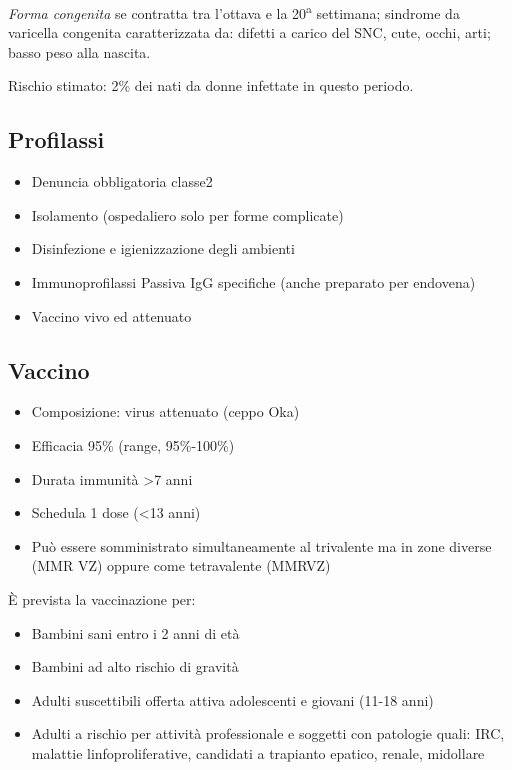 \emph{Forma congenita} se contratta tra l'ottava e la
20\textsuperscript{a} settimana; sindrome da varicella congenita
caratterizzata da: difetti a carico del SNC, cute, occhi, arti; basso
peso alla nascita.

Rischio stimato: 2\% dei nati da donne infettate in questo periodo.

\subsection{Profilassi}

\begin{itemize}
\item
  Denuncia obbligatoria classe2
\item
  Isolamento (ospedaliero solo per forme complicate)
\item
  Disinfezione e igienizzazione degli ambienti
\item
  Immunoprofilassi Passiva IgG specifiche (anche preparato per endovena)
\item
  Vaccino vivo ed attenuato
\end{itemize}

\subsection{Vaccino}

\begin{itemize}
\item
  Composizione: virus attenuato (ceppo Oka)
\item
  Efficacia 95\% (range, 95\%-100\%)
\item
  Durata immunità \textgreater{}7 anni
\item
  Schedula 1 dose (\textless{}13 anni)
\item
  Può essere somministrato simultaneamente al trivalente ma in zone
  diverse (MMR VZ) oppure come tetravalente (MMRVZ)
\end{itemize}

È prevista la vaccinazione per:

\begin{itemize}
\item
  Bambini sani entro i 2 anni di età
\item
  Bambini ad alto rischio di gravità
\item
  Adulti suscettibili offerta attiva adolescenti e giovani (11-18 anni)
\item
  Adulti a rischio per attività professionale e soggetti con patologie
  quali: IRC, malattie linfoproliferative, candidati a trapianto
  epatico, renale, midollare
\end{itemize}

